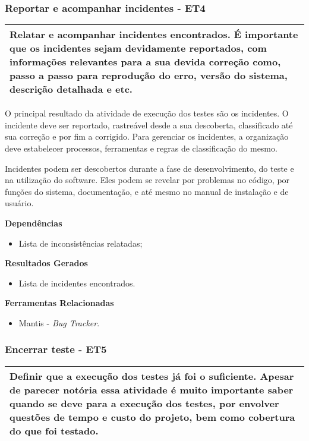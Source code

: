 \subsubsection{Reportar e acompanhar incidentes - ET4}
\label{sec:et4}

\begin{table}[!ht]
\centering
\begin{tabular}{|p{130mm}|}
\hline
Relatar e acompanhar incidentes encontrados. É importante que os incidentes sejam devidamente reportados, com informações relevantes para a sua devida correção como, passo a passo para reprodução do erro, versão do sistema, descrição detalhada e etc. \\ 
\hline
\end{tabular}
\end{table}

O principal resultado da atividade de execução dos testes são os incidentes. O incidente deve ser reportado, rastreável desde a sua descoberta, classificado até sua correção e por fim a corrigido. Para gerenciar os incidentes, a organização deve estabelecer processos, ferramentas e regras de classificação do mesmo.

Incidentes podem ser descobertos durante a fase de desenvolvimento, do teste e na utilização do software. Eles podem se revelar por problemas no código, por funções do sistema, documentação, e até mesmo no manual de instalação e de usuário.

\textbf{Dependências}
\begin{itemize}
    \item Lista de inconsistências relatadas;
\end{itemize}

\textbf{Resultados Gerados}
\begin{itemize}
\item Lista de incidentes encontrados.
\end{itemize}

\textbf{Ferramentas Relacionadas}
\begin{itemize}
    \item Mantis - \textit{Bug Tracker}.
\end{itemize}


\subsubsection{Encerrar teste - ET5}
\label{sec:et5}

\begin{table}[!ht]
\centering
\begin{tabular}{|p{130mm}|}
\hline
Definir que a execução dos testes já foi o suficiente. Apesar de parecer notória essa atividade é muito importante saber quando se   deve para a execução dos testes, por envolver questões de tempo e custo do   projeto, bem como cobertura do que foi testado. \\ 
\hline
\end{tabular}
\end{table}

